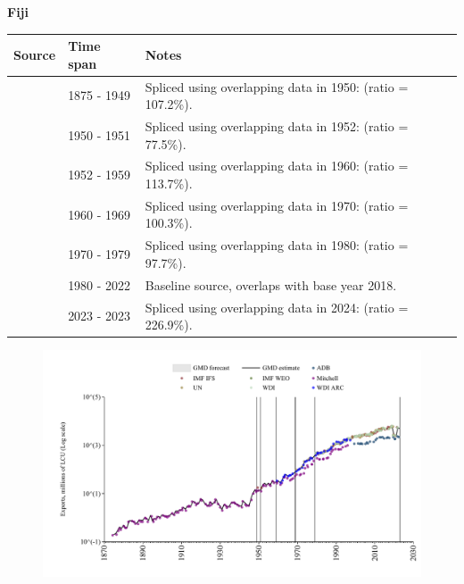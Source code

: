 \documentclass[12pt,a4paper,landscape]{article}
\begin{document}
\begin{adjustbox}{max totalsize={\paperwidth}{\paperheight},center}
\begin{minipage}[t][\textheight][t]{\textwidth}
\vspace*{0.5cm}
{}
\begin{center}
{\Large\bfseries Fiji}
\end{center}
\vspace{0.5cm}
\begin{table}[H]
\centering
\small
\begin{tabular}{|l|l|l|}
\hline
\textbf{Source} & \textbf{Time span} & \textbf{Notes} \\
\hline
\rowcolor{white}\cite{Mitchell}& 1875 - 1949 &Spliced using overlapping data in 1950: (ratio = 107.2\%).\\
\rowcolor{lightgray}\cite{IMF_IFS}& 1950 - 1951 &Spliced using overlapping data in 1952: (ratio = 77.5\%).\\
\rowcolor{white}\cite{Mitchell}& 1952 - 1959 &Spliced using overlapping data in 1960: (ratio = 113.7\%).\\
\rowcolor{lightgray}\cite{WDI_ARC}& 1960 - 1969 &Spliced using overlapping data in 1970: (ratio = 100.3\%).\\
\rowcolor{white}\cite{UN}& 1970 - 1979 &Spliced using overlapping data in 1980: (ratio = 97.7\%).\\
\rowcolor{lightgray}\cite{WDI}& 1980 - 2022 &Baseline source, overlaps with base year 2018.\\
\rowcolor{white}\cite{ADB}& 2023 - 2023 &Spliced using overlapping data in 2024: (ratio = 226.9\%).\\
\hline
\end{tabular}
\end{table}
\begin{figure}[H]
\centering
\includegraphics[width=\textwidth,height=0.6\textheight,keepaspectratio]{graphs/FJI_exports.pdf}
\end{figure}
\end{minipage}
\end{adjustbox}
\end{document}
